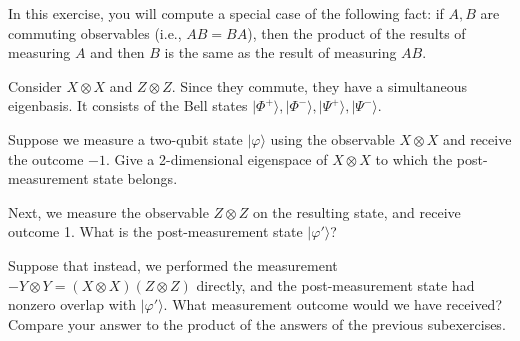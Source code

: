 \documentclass[a4paper,10pt,landscape,twocolumn]{scrartcl}
\newcommand{\ket}[1]{\lvert #1 \rangle}
\begin{document}
\begin{exercise}
	In this exercise, you will compute a special case of the following fact: if $A,B$ are commuting observables (i.e., $AB = BA$), then the product of the results of measuring $A$ and then $B$ is the same as the result of measuring $AB$.
	
	Consider $X \otimes X$ and $Z \otimes Z$. Since they commute, they have a simultaneous eigenbasis. It consists of the Bell states $\ket{\Phi^+}, \ket{\Phi^-}, \ket{\Psi^+}, \ket{\Psi^-}$.
	\begin{subex}
		Suppose we measure a two-qubit state $\ket{\varphi}$ using the observable $X \otimes X$ and receive the outcome $-1$. Give a 2-dimensional eigenspace of $X \otimes X$ to which the post-measurement state belongs.
	\end{subex}
	\begin{subex}
		Next, we measure the observable $Z \otimes Z$ on the resulting state, and receive outcome 1. What is the post-measurement state $\ket{\varphi'}$?
	\end{subex}
	\begin{subex}
		Suppose that instead, we performed the measurement $-Y \otimes Y = (X \otimes X)(Z \otimes Z)$ directly, and the post-measurement state had nonzero overlap with $\ket{\varphi'}$. What measurement outcome would we have received?
		\\Compare your answer to the product of the answers of the previous subexercises.
	\end{subex}
\end{exercise}
\end{document}
